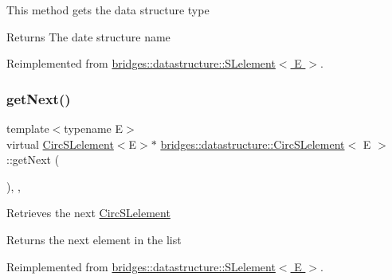 This method gets the data structure type

\begin{DoxyReturn}{Returns}
The date structure name 
\end{DoxyReturn}


Reimplemented from \hyperlink{classbridges_1_1datastructure_1_1_s_lelement_a602156aacacd73d1faa365d68d8af31b}{bridges\+::datastructure\+::\+S\+Lelement$<$ E $>$}.

\mbox{\label{classbridges_1_1datastructure_1_1_circ_s_lelement_aff77056ace1361a35a09dc006eba34a3}} 
\subsubsection{\texorpdfstring{get\+Next()}{getNext()}}
{\footnotesize\ttfamily template$<$typename E$>$ \\
virtual \hyperlink{classbridges_1_1datastructure_1_1_circ_s_lelement}{Circ\+S\+Lelement}$<$E$>$$\ast$ \hyperlink{classbridges_1_1datastructure_1_1_circ_s_lelement}{bridges\+::datastructure\+::\+Circ\+S\+Lelement}$<$ E $>$\+::get\+Next (\begin{DoxyParamCaption}{ }\end{DoxyParamCaption})\hspace{0.3cm}{\ttfamily [inline]}, {\ttfamily [override]}, {\ttfamily [virtual]}}

Retrieves the next \hyperlink{classbridges_1_1datastructure_1_1_circ_s_lelement}{Circ\+S\+Lelement} \begin{DoxyReturn}{Returns}
the next element in the list 
\end{DoxyReturn}


Reimplemented from \hyperlink{classbridges_1_1datastructure_1_1_s_lelement_ae43dd771d9ced7cb17f1d35f34cd9a42}{bridges\+::datastructure\+::\+S\+Lelement$<$ E $>$}.

\mbox{\label{classbridges_1_1datastructure_1_1_circ_s_lelement_a623d302217fce43a444e6da5e1de9b40}} 

